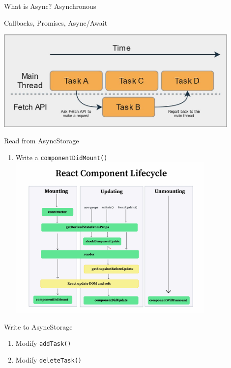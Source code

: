 \documentclass{beamer}
\begin{document}
\begin{frame}{What is Async?}
	Asynchronous

	\bigskip\pause

	Callbacks, Promises, Async/Await

	\bigskip

	\includegraphics[width=0.9\textwidth]{figs/asynchronous.jpg}
\end{frame}

\begin{frame}{Read from AsyncStorage}
	\begin{enumerate}
		\item Write a \texttt{componentDidMount()} \pause
		\includegraphics[width=0.8\textwidth]{figs/component-lifecycle.jpeg}
	\end{enumerate}
\end{frame}

\begin{frame}{Write to AsyncStorage}
	\begin{enumerate}
		\item Modify \texttt{addTask()} \pause
		\item Modify \texttt{deleteTask()}
	\end{enumerate}
\end{frame}
\end{document}
